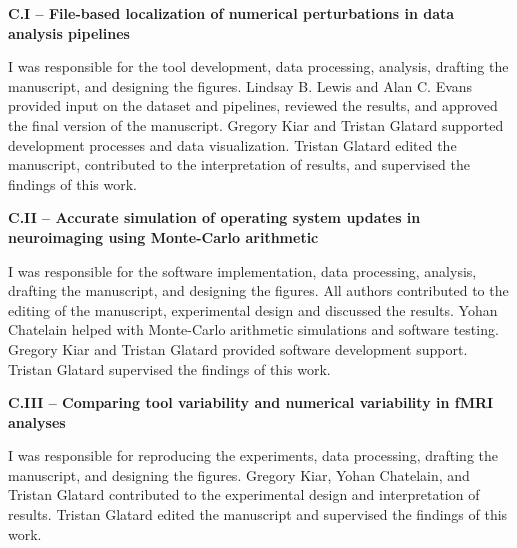 \textbf{C.I – File-based localization of numerical perturbations in data analysis pipelines}

I was responsible for the tool development, data processing, analysis, drafting the manuscript, and designing the figures.
Lindsay B. Lewis and Alan C. Evans provided input on the dataset and pipelines, reviewed the results, and approved the final version of the manuscript.
Gregory Kiar and Tristan Glatard supported development processes and data visualization.
Tristan Glatard edited the manuscript, contributed to the interpretation of results, and supervised the findings of this work.

\textbf{C.II – Accurate simulation of operating system updates in neuroimaging using Monte-Carlo arithmetic}

I was responsible for the software implementation, data processing, analysis, drafting the manuscript, and designing the figures.
All authors contributed to the editing of the manuscript, experimental design and discussed the results.
Yohan Chatelain helped with Monte-Carlo arithmetic simulations and software testing.
Gregory Kiar and Tristan Glatard provided software development support.
Tristan Glatard supervised the findings of this work.

\textbf{C.III – Comparing tool variability and numerical variability in fMRI analyses}

I was responsible for reproducing the experiments, data processing, drafting the manuscript, and designing the figures.
Gregory Kiar, Yohan Chatelain, and Tristan Glatard contributed to the experimental design and interpretation of results.
Tristan Glatard edited the manuscript and supervised the findings of this work.

